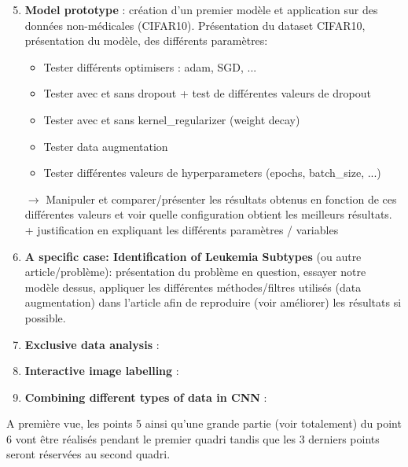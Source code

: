 \documentclass{article}
\begin{document}
\begin{enumerate}
\setcounter{enumi}{4}

\item \textbf{Model prototype} : création d'un premier modèle et application sur des données non-médicales (CIFAR10). Présentation du dataset CIFAR10, présentation du modèle, des différents paramètres: 

\begin{itemize}
\item Tester différents optimisers : adam, SGD, ...
\item Tester avec et sans dropout + test de différentes valeurs de dropout
\item Tester avec et sans kernel\_regularizer (weight decay)
\item Tester data augmentation
\item Tester différentes valeurs de hyperparameters (epochs, batch\_size, ...) 
\end{itemize}

$\rightarrow$ Manipuler et comparer/présenter les résultats obtenus en fonction de ces différentes valeurs et voir quelle configuration obtient les meilleurs résultats. + justification en expliquant les différents paramètres / variables   

\item \textbf{A specific case: Identification of Leukemia Subtypes} (ou autre article/problème): présentation du problème en question, essayer notre modèle dessus, appliquer les différentes méthodes/filtres utilisés (data augmentation) dans l'article afin de reproduire (voir améliorer) les résultats si possible. 


\item \textbf{Exclusive data analysis} : 

\item \textbf{Interactive image labelling} : 

\item \textbf{Combining different types of data in CNN} : 

\end{enumerate}

A première vue, les points 5 ainsi qu'une grande partie (voir totalement) du point 6 vont être réalisés pendant le premier quadri tandis que les 3 derniers points seront réservées au second quadri. 
\end{document}
